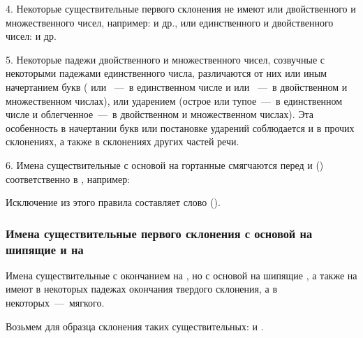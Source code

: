 \documentclass[11pt,a4paper,oneside]{memoir}
\begin{document}
    4. Некоторые существительные первого склонения не имеют или двойственного и множественного чисел, например: {} и др., или единственного и двойственного чисел: {} и др.
    
    5. Некоторые падежи двойственного и множественного чисел, созвучные с некоторыми падежами единственного числа, различаются от них или иным начертанием букв ({} или {}~---~в единственном числе и {} или {}~---~в двойственном и множественном числах), или ударением (острое или тупое~---~в единственном числе и облегченное~---~в двойственном и множественном числах). Эта особенность в начертании букв или постановке ударений соблюдается и в прочих склонениях, а также в склонениях других частей речи.
    
    6. Имена существительные с основой на гортанные {} смягчаются перед {} и {} ({}) соответственно в {}, например:
    
    \bigskip{}

    Исключение из этого правила составляет слово {} ({}).


                \subsubsection{Имена существительные первого склонения с основой на шипящие и на {}}

    Имена существительные с окончанием на {}, но с основой на шипящие {}, а также на {} имеют в некоторых падежах окончания твердого склонения, а в некоторых~---~мягкого.
    
    Возьмем для образца склонения таких существительных: {} и {}.
    
\end{document}
